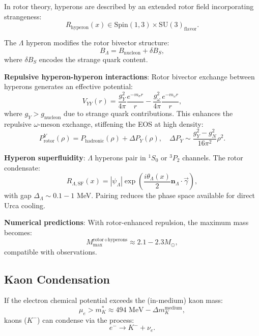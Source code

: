 \documentclass[12pt,a4paper]{article}
\theoremstyle{definition}
\theoremstyle{remark}
\begin{document}
In rotor theory, hyperons are described by an extended rotor field incorporating strangeness:
\begin{equation}
R_{\text{hyperon}}(x) \in \mathrm{Spin}(1,3) \times \mathrm{SU}(3)_{\text{flavor}}.
\end{equation}

The $\Lambda$ hyperon modifies the rotor bivector structure:
\begin{equation}
B_{\Lambda} = B_{\text{nucleon}} + \delta B_S,
\end{equation}
where $\delta B_S$ encodes the strange quark content.

\textbf{Repulsive hyperon-hyperon interactions}: Rotor bivector exchange between hyperons generates an effective potential:
\begin{equation}
V_{YY}(r) = \frac{g_Y^2}{4\pi} \frac{e^{-m_\sigma r}}{r} - \frac{g_\omega^2}{4\pi} \frac{e^{-m_\omega r}}{r},
\end{equation}
where $g_Y > g_{\text{nucleon}}$ due to strange quark contributions. This enhances the repulsive $\omega$-meson exchange, stiffening the EOS at high density:
\begin{equation}
P_{\text{rotor}}^Y(\rho) = P_{\text{hadronic}}(\rho) + \Delta P_Y(\rho), \quad \Delta P_Y \sim \frac{g_Y^2 - g_N^2}{16\pi^2} \rho^2.
\end{equation}

\textbf{Hyperon superfluidity}: $\Lambda$ hyperons pair in $^1S_0$ or $^3P_2$ channels. The rotor condensate:
\begin{equation}
R_{\Lambda,\text{SF}}(x) = |\psi_\Lambda| \exp\left(\frac{i\theta_\Lambda(x)}{2} \mathbf{n}_\Lambda \cdot \vec{\gamma}\right),
\end{equation}
with gap $\Delta_\Lambda \sim 0.1-1$ MeV. Pairing reduces the phase space available for direct Urca cooling.

\textbf{Numerical predictions}: With rotor-enhanced repulsion, the maximum mass becomes:
\begin{equation}
M_{\text{max}}^{\text{rotor+hyperons}} \approx 2.1-2.3 M_\odot,
\end{equation}
compatible with observations.

\subsection{Kaon Condensation}

If the electron chemical potential exceeds the (in-medium) kaon mass:
\begin{equation}
\mu_e > m_K^* \approx 494 \text{ MeV} - \Delta m_K^{\text{medium}},
\end{equation}
kaons ($K^-$) can condense via the process:
\begin{equation}
e^- \to K^- + \nu_e.
\end{equation}
\end{document}
